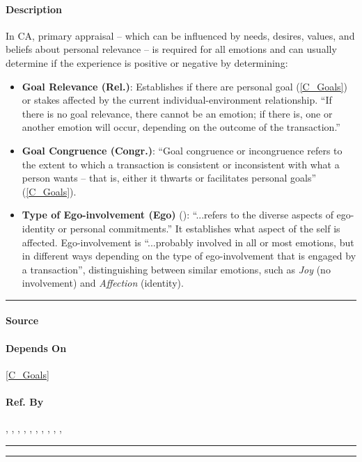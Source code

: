 \paragraph{Description} In CA, primary appraisal -- which can be
influenced by needs, desires, values, and beliefs about personal relevance
--
is required for all emotions and can usually determine if the experience is
positive or negative by determining:
\begin{itemize}
    \item \textbf{Goal Relevance (Rel.)}: Establishes if there are personal
    goal (\cref{C_Goals}) or stakes affected by the current
    individual-environment relationship. ``If there is no goal relevance,
    there
    cannot be an emotion; if there is, one or another emotion will occur,
    depending on the outcome of the transaction.''

    \item \textbf{Goal Congruence (Congr.)}: ``Goal congruence or
    incongruence
    refers to the extent to which a transaction is consistent or
    inconsistent
    with what a person wants -- that is, either it thwarts or facilitates
    personal goals'' (\cref{C_Goals}).

    \item \textbf{Type of Ego-involvement (Ego)} (): ``...refers
    to the diverse aspects of ego-identity or personal commitments.'' It
    establishes what aspect of the self is affected. Ego-involvement is
    ``...probably involved in all or most emotions, but in different ways
    depending on the type of ego-involvement that is engaged by a
    transaction'', distinguishing between similar emotions, such as
    \textit{Joy} (no involvement) and \textit{Affection} (identity).
\end{itemize}

\hrule

\paragraph{Source} \citet[p.~149--150]{lazarus1991emotion}

\paragraph{Depends On} \cref{C_Goals}

\paragraph{Ref. By} , , ,
, , ,
, , ,
, 
\\\hrule\vspace{0.5mm}\hrule

